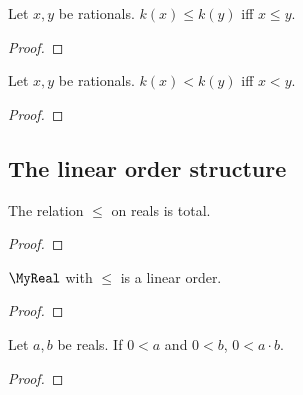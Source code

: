\begin{lemma}
    \leanok
    Let $x,y$ be rationals.
    $k(x) \leq k(y)$ iff $x \leq y$.
\end{lemma}
\begin{proof}
    \leanok
\end{proof}

\begin{lemma}
    \leanok
    Let $x,y$ be rationals.
    $k(x) < k(y)$ iff $x < y$.
\end{lemma}
\begin{proof}
    \leanok
\end{proof}

\subsection{The linear order structure}

\begin{lemma}
    \leanok
    The relation $\leq$ on reals is total.
\end{lemma}
\begin{proof}
    \leanok
\end{proof}

\begin{proposition}
    \leanok
    $\MyReal$ with $\leq$ is a linear order.
\end{proposition}
\begin{proof}
    \leanok
\end{proof}

\begin{lemma}
    \leanok
    Let $a,b$ be reals.
    If $0 < a$ and $0 < b$, $0 < a \cdot b$.
\end{lemma}
\begin{proof}
    \leanok
\end{proof}

